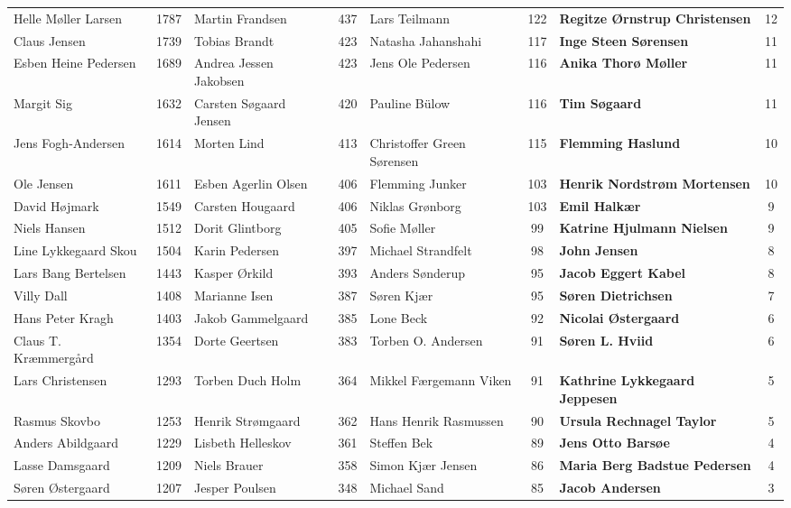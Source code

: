 \begin{table}[h]
\begin{tabular}{l|c|l|c|l|c|l|c}
		Helle Møller Larsen & 1787 & Martin Frandsen & 437 & Lars Teilmann & 122 & \textbf{Regitze Ørnstrup Christensen} & 12 \\
		Claus Jensen & 1739 & Tobias Brandt & 423 & Natasha Jahanshahi & 117 & \textbf{Inge Steen Sørensen} & 11 \\
		Esben Heine Pedersen & 1689 & Andrea Jessen Jakobsen & 423 & Jens Ole Pedersen & 116 & \textbf{Anika Thorø Møller} & 11 \\
		Margit Sig & 1632 & Carsten Søgaard Jensen & 420 & Pauline Bülow & 116 & \textbf{Tim Søgaard} & 11 \\
		Jens Fogh-Andersen & 1614 & Morten Lind & 413 & Christoffer Green Sørensen & 115 & \textbf{Flemming Haslund} & 10 \\
		Ole Jensen & 1611 & Esben Agerlin Olsen & 406 & Flemming Junker & 103 & \textbf{Henrik Nordstrøm Mortensen} & 10 \\
		David Højmark & 1549 & Carsten Hougaard & 406 & Niklas Grønborg & 103 & \textbf{Emil Halkær} & 9 \\
		Niels Hansen & 1512 & Dorit Glintborg & 405 & Sofie Møller & 99 & \textbf{Katrine Hjulmann Nielsen} & 9 \\
		Line Lykkegaard Skou & 1504 & Karin Pedersen & 397 & Michael Strandfelt & 98 & \textbf{John Jensen} & 8 \\
		Lars Bang Bertelsen & 1443 & Kasper Ørkild & 393 & Anders Sønderup & 95 & \textbf{Jacob Eggert Kabel} & 8 \\
		Villy Dall & 1408 & Marianne Isen & 387 & Søren Kjær & 95 & \textbf{Søren Dietrichsen} & 7 \\
		Hans Peter Kragh & 1403 & Jakob Gammelgaard & 385 & Lone Beck & 92 & \textbf{Nicolai Østergaard} & 6 \\
		Claus T. Kræmmergård & 1354 & Dorte Geertsen & 383 & Torben O. Andersen & 91 & \textbf{Søren L. Hviid} & 6 \\
		Lars Christensen & 1293 & Torben Duch Holm & 364 & Mikkel Færgemann Viken & 91 & \textbf{Kathrine Lykkegaard Jeppesen} & 5 \\
		Rasmus Skovbo & 1253 & Henrik Strømgaard & 362 & Hans Henrik Rasmussen & 90 & \textbf{Ursula Rechnagel Taylor} & 5 \\
		Anders Abildgaard & 1229 & Lisbeth Helleskov & 361 & Steffen Bek & 89 & \textbf{Jens Otto Barsøe} & 4 \\
		Lasse Damsgaard & 1209 & Niels Brauer & 358 & Simon Kjær Jensen & 86 & \textbf{Maria Berg Badstue Pedersen} & 4 \\
		Søren Østergaard & 1207 & Jesper Poulsen & 348 & Michael Sand & 85 & \textbf{Jacob Andersen} & 3 \\

\end{tabular}
\end{table}
